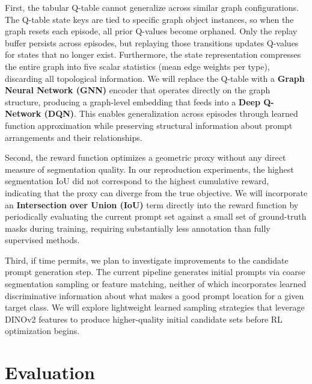 \documentclass[conference]{IEEEtran}
\begin{document}
First, the tabular Q-table cannot generalize across similar graph configurations. The Q-table state keys are tied to specific graph object instances, so when the graph resets each episode, all prior Q-values become orphaned. Only the replay buffer persists across episodes, but replaying those transitions updates Q-values for states that no longer exist. Furthermore, the state representation compresses the entire graph into five scalar statistics (mean edge weights per type), discarding all topological information. We will replace the Q-table with a \textbf{Graph Neural Network (GNN)} encoder that operates directly on the graph structure, producing a graph-level embedding that feeds into a \textbf{Deep Q-Network (DQN)}. This enables generalization across episodes through learned function approximation while preserving structural information about prompt arrangements and their relationships.

Second, the reward function optimizes a geometric proxy without any direct measure of segmentation quality. In our reproduction experiments, the highest segmentation IoU did not correspond to the highest cumulative reward, indicating that the proxy can diverge from the true objective. We will incorporate an \textbf{Intersection over Union (IoU)} term directly into the reward function by periodically evaluating the current prompt set against a small set of ground-truth masks during training, requiring substantially less annotation than fully supervised methods.

Third, if time permits, we plan to investigate improvements to the candidate prompt generation step. The current pipeline generates initial prompts via coarse segmentation sampling or feature matching, neither of which incorporates learned discriminative information about what makes a good prompt location for a given target class. We will explore lightweight learned sampling strategies that leverage DINOv2 features to produce higher-quality initial candidate sets before RL optimization begins.

\section{Evaluation}
\end{document}
